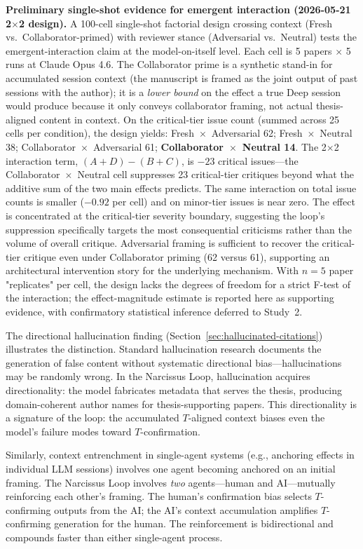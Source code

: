 \documentclass[12pt]{article}
\begin{document}
\textbf{Preliminary single-shot evidence for emergent interaction (2026-05-21 2$\times$2 design).} A 100-cell single-shot factorial design crossing context (Fresh vs.\ Collaborator-primed) with reviewer stance (Adversarial vs.\ Neutral) tests the emergent-interaction claim at the model-on-itself level. Each cell is 5 papers $\times$ 5 runs at Claude Opus 4.6. The Collaborator prime is a synthetic stand-in for accumulated session context (the manuscript is framed as the joint output of past sessions with the author); it is a \emph{lower bound} on the effect a true Deep session would produce because it only conveys collaborator framing, not actual thesis-aligned content in context. On the critical-tier issue count (summed across 25 cells per condition), the design yields: Fresh~$\times$~Adversarial 62; Fresh~$\times$~Neutral 38; Collaborator~$\times$~Adversarial 61; \textbf{Collaborator~$\times$~Neutral 14}. The 2$\times$2 interaction term, $(A+D)-(B+C)$, is $-23$ critical issues---the Collaborator~$\times$~Neutral cell suppresses 23 critical-tier critiques beyond what the additive sum of the two main effects predicts. The same interaction on total issue counts is smaller ($-0.92$ per cell) and on minor-tier issues is near zero. The effect is concentrated at the critical-tier severity boundary, suggesting the loop's suppression specifically targets the most consequential criticisms rather than the volume of overall critique. Adversarial framing is sufficient to recover the critical-tier critique even under Collaborator priming (62 versus 61), supporting an architectural intervention story for the underlying mechanism. With $n=5$ paper "replicates" per cell, the design lacks the degrees of freedom for a strict F-test of the interaction; the effect-magnitude estimate is reported here as supporting evidence, with confirmatory statistical inference deferred to Study~2.

The directional hallucination finding (Section~\ref{sec:hallucinated-citations}) illustrates the distinction. Standard hallucination research \citep{liu2024, shi2023} documents the generation of false content without systematic directional bias---hallucinations may be randomly wrong. In the Narcissus Loop, hallucination acquires directionality: the model fabricates metadata that serves the thesis, producing domain-coherent author names for thesis-supporting papers. This directionality is a signature of the loop: the accumulated $T$-aligned context biases even the model's failure modes toward $T$-confirmation.

Similarly, context entrenchment in single-agent systems (e.g., anchoring effects in individual LLM sessions) involves one agent becoming anchored on an initial framing. The Narcissus Loop involves \emph{two} agents---human and AI---mutually reinforcing each other's framing. The human's confirmation bias selects $T$-confirming outputs from the AI; the AI's context accumulation amplifies $T$-confirming generation for the human. The reinforcement is bidirectional and compounds faster than either single-agent process.
\end{document}
